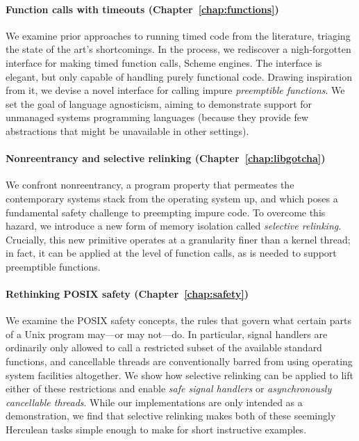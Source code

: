 \paragraph{Function calls with timeouts (Chapter~\ref{chap:functions})}
We examine prior approaches to running timed code from the literature, triaging the
state of the art's shortcomings.  In the process, we rediscover a nigh-forgotten
interface
for making timed function calls, Scheme engines.  The interface is elegant, but only
capable of handling purely functional code.  Drawing inspiration from it, we
devise a novel interface for calling impure \textit{preemptible functions}.
We set the goal of language agnosticism, aiming to demonstrate support
for unmanaged systems programming languages (because they provide few abstractions
that might be unavailable in other settings).

\paragraph{Nonreentrancy and selective relinking (Chapter~\ref{chap:libgotcha})}
We confront nonreentrancy, a program property that permeates the contemporary systems
stack from the operating system up, and which poses a fundamental safety challenge to
preempting impure code.  To overcome this hazard, we introduce a new form of memory
isolation called \textit{selective relinking}.  Crucially, this new primitive
operates at a granularity finer than a kernel thread; in fact, it can be applied at
the level of function calls, as is needed to support preemptible functions.

\paragraph{Rethinking POSIX safety (Chapter~\ref{chap:safety})}
We examine the POSIX safety concepts, the rules that govern what certain parts of a
Unix program may---or may not---do.  In particular, signal handlers are ordinarily
only allowed to call a restricted subset of the available standard functions, and
cancellable threads are conventionally barred from using operating system facilities
altogether.  We show how selective relinking can be applied to lift either of these
restrictions and enable \textit{safe signal handlers} or \textit{asynchronously
cancellable threads}.  While our implementations are only intended as a
demonstration, we find that selective relinking makes both of these seemingly
Herculean tasks simple enough to make for short instructive examples.

